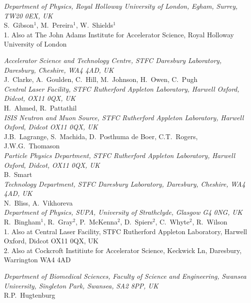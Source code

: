\noindent \textit{Department of Physics, Royal Holloway University of London, Egham, Surrey, TW20 0EX, UK} \\
S.~Gibson$^{1}$, M.~Pereira$^{1}$, W.~Shields$^{1}$ \\
{\footnotesize
  1. Also at The John Adams Institute for Accelerator Science, Royal Holloway University of London \\
}
 
\noindent \textit{Accelerator Science and Technology Centre, STFC Daresbury Laboratory, Daresbury, Cheshire, WA4 4AD, UK} \\
J.~Clarke, A.~Goulden, C.~Hill, M.~Johnson, H.~Owen, C.~Pugh \\
 
\noindent \textit{Central Laser Facility, STFC Rutherford Appleton Laboratory, Harwell Oxford, Didcot, OX11 0QX, UK} \\
H.~Ahmed, R.~Pattathil \\
 
\noindent \textit{ISIS Neutron and Muon Source, STFC Rutherford Appleton Laboratory, Harwell Oxford, Didcot OX11 0QX, UK} \\
J.B.~Lagrange, S.~Machida, D.~Posthuma de Boer, C.T.~Rogers, J.W.G.~Thomason \\
 
\noindent \textit{Particle Physics Department, STFC Rutherford Appleton Laboratory, Harwell Oxford, Didcot, OX11 0QX, UK} \\
B.~Smart \\
 
\noindent \textit{Technology Department, STFC Daresbury Laboratory, Daresbury, Cheshire, WA4 4AD, UK} \\
N.~Bliss, A.~Vikhoreva \\
 
\noindent \textit{Department of Physics, SUPA, University of Strathclyde, Glasgow G4 0NG, UK} \\
R.~Bingham$^{1}$, R.~Gray$^{2}$, P.~McKenna$^{2}$, D.~Spiers$^{2}$, C.~Whyte$^{2}$, R.~Wilson \\
{\footnotesize
  1. Also at Central Laser Facility, STFC Rutherford Appleton Laboratory, Harwell Oxford, Didcot OX11 0QX, UK \\
  2. Also at Cockcroft Institiute for Accelerator Science, Keckwick Ln, Daresbury, Warrington WA4 4AD \\
}
 
\noindent \textit{Department of Biomedical Sciences, Faculty of Science and Engineering, Swansea University, Singleton Park, Swansea, SA2 8PP, UK} \\
R.P.~Hugtenburg \\
 
